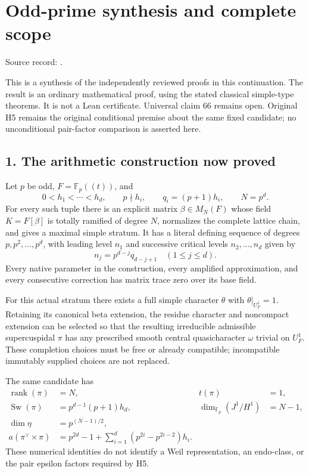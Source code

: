 \clearpage
\section{Odd-prime synthesis and complete scope}\label{app:odd_synthesis}

Source record: .

This is a synthesis of the independently reviewed proofs in this
continuation. The result is an ordinary mathematical proof, using the
stated classical simple-type theorems. It is not a Lean certificate.
Universal claim 66 remains open. Original H5 remains the original
conditional premise about the same fixed candidate; no unconditional
pair-factor comparison is asserted here.

\hypertarget{odd_synthesis-the-arithmetic-construction-now-proved}{%
\subsection{1. The arithmetic construction now
proved}\label{odd_synthesis-the-arithmetic-construction-now-proved}}

Let \(p\) be odd, \(F=\mathbb F_p((t))\), and \[
0<h_1<\cdots<h_d,\qquad p\nmid h_i,\qquad
q_i=(p+1)h_i,\qquad N=p^d.
\] For every such tuple there is an explicit matrix \(\beta\in M_N(F)\)
whose field \(K=F[\beta]\) is totally ramified of degree \(N\),
normalizes the complete lattice chain, and gives a maximal simple
stratum. It has a literal defining sequence of degrees
\(p,p^2,\ldots,p^d\), with leading level \(n_1\) and successive critical
levels \(n_2,\ldots,n_d\) given by \[
n_j=p^{d-j}q_{d-j+1}\quad(1\le j\le d).
\] Every native parameter in the construction, every amplified
approximation, and every consecutive correction has matrix trace zero
over its base field.

For this actual stratum there exists a full simple character \(\theta\)
with \(\theta|_{U_F^1}=1\). Retaining its canonical beta extension, the
residue character and noncompact extension can be selected so that the
resulting irreducible admissible supercuspidal \(\pi\) has any
prescribed smooth central quasicharacter \(\omega\) trivial on
\(U_F^1\). These completion choices must be free or already compatible;
incompatible immutably supplied choices are not replaced.

The same candidate has \[
\begin{aligned}
\operatorname{rank}(\pi)&=N, &t(\pi)&=1,\\
\operatorname{Sw}(\pi)&=p^{d-1}(p+1)h_d, &
\dim_{\mathbb F_p}(J^1/H^1)&=N-1,\\
\dim\eta&=p^{(N-1)/2},\\
a(\pi^\vee\times\pi)
 &=p^{2d}-1+\sum_{i=1}^d(p^{2i}-p^{2i-2})h_i.
\end{aligned}
\] These numerical identities do not identify a Weil representation, an
endo-class, or the pair epsilon factors required by H5.

